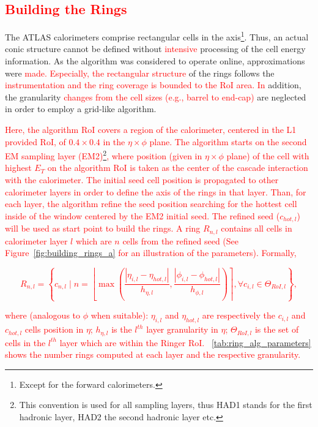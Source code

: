 \subsection{\textcolor{red}{Building the Rings}}\label{top:algorithm}

The ATLAS calorimeters comprise rectangular cells in the
\etaphi axis\footnote{Except for the forward calorimeters.}. Thus, an actual conic structure cannot be defined
without \textcolor{red}{intensive} processing of the cell energy information. As the algorithm was
considered to operate online, approximations were  \textcolor{red}{made. Especially, the rectangular structure} of
the rings follows the \textcolor{red}{instrumentation and the ring coverage is bounded to the RoI area. In} addition, the granularity \textcolor{red}{changes from the cell sizes (e.g., barrel to end-cap)} are neglected in order to employ a
grid-like algorithm.


\textcolor{red}{Here, the algorithm RoI covers a
region of the calorimeter, centered in the L1 provided RoI, of
$0.4\times0.4$ in the $\eta\times\phi$ plane. The algorithm
starts on the second EM sampling layer (EM2)\footnote{This convention is used for all sampling layers, thus HAD1 stands for the first hadronic layer, HAD2 the second hadronic layer etc.}, where position (given in $\eta\times\phi$ plane) of the cell with
highest $E_T$ on the algorithm RoI is taken as the center of the cascade
interaction with the calorimeter. The initial seed cell position is propagated to other calorimeter layers in order to define the axis of the rings in that layer. Than, for each layer, the algorithm refine the seed position searching for the hottest cell inside of the window centered by the EM2 initial seed. The refined seed ($c_{hot,l}$) will be used as start point to build the rings. A ring $R_{n,l}$ contains all cells in calorimeter layer $l$ which are $n$ cells from the refined seed (See Figure~\ref{fig:building_rings_a} for an illustration of the parameters). Formally,}

\textcolor{red}{
\begin{equation}
\label{eq:ring_idx}
R_{n,l} = \left\{c_{n,l} \mid n = \left\lfloor \max{\left( 
\frac{| \eta_{i,l} - \eta_{hot,l} |}{h_{\eta,l}}, 
\frac{| \phi_{i,l} - \phi_{hot,l} |}{h_{\phi,l}} 
\right)} \right\rceil, 
\forall c_{i,l} \in
\Theta_{RoI,l}
\right\},
\end{equation}
}

\textcolor{red}{
\noindent where (analogous to $\phi$ when suitable): $\eta_{i,l}$
and $\eta_{hot,l}$ are respectively the $c_{i,l}$ and $c_{hot,l}$
cells position in $\eta$; $h_{\eta,l}$ is the $l^{th}$ layer granularity in $\eta$; $\Theta_{RoI,l}$ is the set of cells
in the $l^{th}$ layer which are within the Ringer RoI.
\tablename~\ref{tab:ring_alg_parameters} shows the number rings computed at each layer and the respective granularity.}

